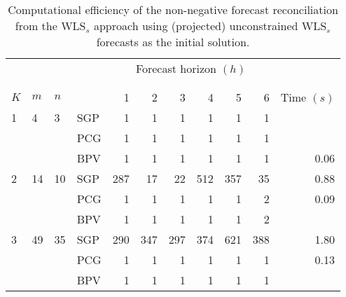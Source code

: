 \documentclass[11pt]{article}
\newcommand{\0}{\phantom{0}}
\begin{document}
\begin{table}[ht]
	\small
	\tabcolsep=0.20cm
	\captionsetup{belowskip=0pt, aboveskip=4pt}
	\caption{Computational efficiency of the non-negative forecast reconciliation from the WLS$_{s}$ approach using (projected) unconstrained WLS$_{s}$ forecasts as the initial solution.}
	\label{tbl:perfnnwlsp}
	\centering
	\begin{threeparttable}
		\begin{tabular}{llllrrrrrrr}
			\toprule
			    &         &         &     & \multicolumn{6}{c}{Forecast horizon $(h)$}                                                            \\[-0.4cm]\\\cline{5-10}\\[-0.3cm]
			$K$ & $m$     & $n$     &     & 1                                          & 2   & 3         & 4         & 5   & 6   & Time $(s)$     \\
			\midrule
			1   & 4       & 3       & SGP & 1                                          & 1   & 1         & 1         & 1   & 1   & \bm{$0.03$}    \\
			    &         &         & PCG & 1                                          & 1   & 1         & 1         & 1   & 1   & \bm{$0.03$}    \\
			    &         &         & BPV & 1                                          & 1   & 1         & 1         & 1   & 1   & 0.06           \\
			\midrule
			2   & 14      & 10      & SGP & 287                                        & 17  & 22        & 512       & 357 & 35  & 0.88           \\
			    &         &         & PCG & 1                                          & 1   & 1         & 1         & 1   & 2   & 0.09           \\
			    &         &         & BPV & 1                                          & 1   & 1         & 1         & 1   & 2   & \bm{$0.08$}    \\
			\midrule
			3   & 49      & 35      & SGP & 290                                        & 347 & 297       & 374       & 621 & 388 & 1.80           \\
			    &         &         & PCG & 1                                          & 1   & 1         & 1         & 1   & 1   & 0.13           \\
			    &         &         & BPV & 1                                          & 1   & 1         & 1         & 1   & 1   & \bm{$0.07$}    \\

\end{tabular}
\end{threeparttable}
\end{table}
\end{document}
